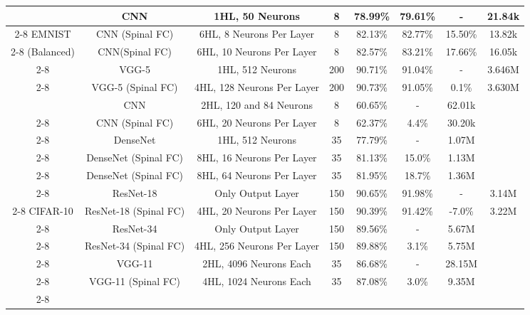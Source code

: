 \documentclass[journal]{IEEEtran}
\begin{document}
\begin{table*}
\begin{tabular}{|c|c|c|c|c|c|c|c|}
    & CNN\cite{MNIST_CNN}& 1HL, 50 Neurons &8 &78.99\%&79.61\%&- & 21.84k\\ \cline{2-8}
 EMNIST  & CNN (Spinal FC) & 6HL, 8 Neurons Per Layer &8 &82.13\%&82.77\%  & 15.50\%&13.82k\\ \cline{2-8}
  (Balanced) \cite{cohen2017emnist}   & CNN(Spinal FC) & 6HL, 10 Neurons Per Layer &8 &82.57\%&83.21\% &17.66\% &16.05k\\ \cline{2-8}
      
      & VGG-5\cite{VGG5} & 1HL, 512 Neurons &200 &90.71\%&91.04\%&- &3.646M\\ \cline{2-8}
      & VGG-5 (Spinal FC) & 4HL, 128 Neurons Per Layer & 200 &90.73\%&91.05\% & 0.1\% &3.630M\\ \hline \hline
      
      
      
      
      
      
      
      
      
\if 0      
      & CNN\cite{CR_CNN2}& 2HL, 120 and 84 Neurons & 8 &60.65\% &- &62.01k\\ \cline{2-8}
     & CNN (Spinal FC) & 6HL, 20 Neurons Per Layer& 8 &62.37\%&4.4\% &30.20k\\ \cline{2-8}
      
  & DenseNet\cite{DenseNet_code} & 1HL, 512 Neurons& 35 &77.79\%&- & 1.07M \\ \cline{2-8}  
      & DenseNet (Spinal FC) &8HL, 16 Neurons Per Layer& 35 &81.13\%&15.0\% &1.13M\\ \cline{2-8}  
 & DenseNet (Spinal FC) &8HL, 64 Neurons Per Layer& 35 &81.95\%&18.7\% & 1.36M\\ \cline{2-8} 
\fi      
 
   & ResNet-18 \cite{he2016deep}&Only Output Layer&150 &90.65\%&91.98\%&- &3.14M\\ \cline{2-8}
CIFAR-10  & ResNet-18 (Spinal FC) & 4HL, 20 Neurons Per Layer &150 &90.39\%&91.42\%  & -7.0\% &3.22M\\ \cline{2-8}
 \if 0
    & ResNet-34 \cite{he2016deep}&Only Output Layer&150 &89.56\%&- &5.67M \\ \cline{2-8}
 & ResNet-34 (Spinal FC) & 4HL, 256 Neurons Per Layer &150 &89.88\%  & 3.1\% &5.75M\\ \cline{2-8}

& VGG-11\cite{simonyan2014very} & 2HL, 4096 Neurons Each &35 &86.68\% &- &28.15M\\ \cline{2-8} 
    & VGG-11 (Spinal FC) &4HL, 1024 Neurons Each &35 &87.08\%&3.0\% &9.35M\\ \cline{2-8} 


\end{tabular}
\end{table*}
\end{document}
